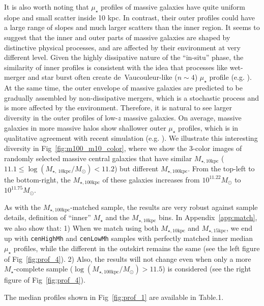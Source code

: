 \documentclass{emulateapj}
\def\rbcg{\texttt{cenHighMh}}
\def\nbcg{\texttt{cenLowMh}}
\def\mstar{{$M_{\star}$}}
\def\minn{{$M_{\star,10\mathrm{kpc}}$}}
\def\meff{{$M_{\star,15\mathrm{kpc}}$}}
\def\mtot{{$M_{\star,100\mathrm{kpc}}$}}
\def\logmtot{{$\log (M_{\star,100\mathrm{kpc}}/M_{\odot})$}}
\def\mden{{$\mu_{\star}$}}
\begin{document}
\begin{CJK*}{UTF8}{gbsn}
    It is also worth noting that \mden{} profiles of massive galaxies have quite uniform
    slope and small scatter inside 10 kpc.  
    In contrast, their outer profiles could have a large range of slopes and much 
    larger scatters than the inner region. 
    It seems to suggest that the inner and outer parts of massive galaxies are shaped 
    by distinctive physical processes, and are affected by their environment at 
    very different level. 
    Given the highly dissipative nature of the ``in-situ'' phase, the similarity of 
    inner profiles is consistent with the idea that processes like wet-merger and 
    star burst often create de~Vaucouleur-like ($n\sim 4$) \mden{} profile
    (e.g. \citealt{Hopkins2008}).
    At the same time, the outer envelope of massive galaxies are predicted to be 
    gradually assembled by non-dissipative mergers, which is a stochastic process and 
    is more affected by the environment.  
    Therefore, it is natural to see larger diversity in the outer profiles of 
    low-$z$ massive galaxies. 
    On average, massive galaxies in more massive halos show shallower outer \mden{} 
    profiles, which is in qualitative agreement with recent simulation
    (e.g. \citealt{Pillepich2014}).
    We illustrate this interesting diversity in Fig~\ref{fig:m100_m10_color}, where 
    we show the 3-color images of randomly selected massive central galaxies that 
    have similar \minn{} ($11.1 \leq \log (M_{\star,\ 10\mathrm{kpc}}/M_{\odot}) < 11.2$)
    but different \mtot{}.   
    From the top-left to the bottom-right, the \mtot{} of these galaxies increases
    from $10^{11.22} M_{\odot}$ to $10^{11.75} M_{\odot}$.
    
    As with the \mtot{}-matched sample, the results are very robust against 
    sample details, definition of ``inner'' \mstar{} and the \minn{} bins. 
    In Appendix~\ref{app:match}, we also show that:
    1) When we match using both \minn{} and \meff{}, we end up with \rbcg{} and \nbcg{} 
    samples with perfectly matched inner median \mden{} profiles, while the different 
    in the outskirt remains the same (see the left figure of Fig~\ref{fig:prof_4}).  
    2) Also, the results will not change even when only a more \mstar{}-complete sample
    (\logmtot{}$> 11.5$) is considered (see the right figure of Fig~\ref{fig:prof_4}). 
      
    The median profiles shown in Fig~\ref{fig:prof_1} are available in Table.1.


\end{CJK*}
\end{document}
